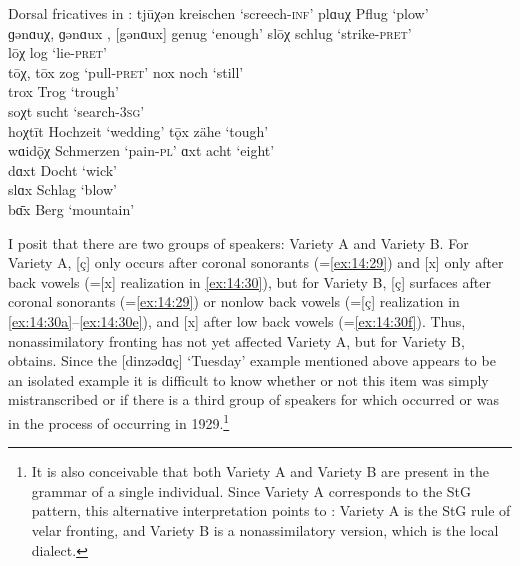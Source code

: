 \ea%
\label{ex:14:30}Dorsal fricatives in :
\ea\label{ex:14:30a} tjūχən \tab [tjuːçən] \tab  kreischen \tab ‘screech\textsc{{}-inf}’ 
\ex\label{ex:14:30b} plɑuχ \tab [plɑuç] \tab Pflug \tab ‘plow’ \\
    ɡənɑuχ, ɡənɑux \tab [gənɑuç], [gənɑux] \tab genug \tab ‘enough’   
\ex\label{ex:14:30c} slōχ \tab [sloːç] \tab schlug \tab ‘strike\textsc{{}-pret}’ \\
    lōχ \tab [loːç] \tab log \tab ‘lie\textsc{{}-pret}’ \\
    tōχ, tōx \tab  [toːç] [toːx] \tab  zog \tab ‘pull\textsc{{}-pret}’ 
\ex\label{ex:14:30d} nox \tab [nox] \tab  noch \tab ‘still’ \\
    trox \tab [trox] \tab Trog \tab ‘trough’ \\
    soχt \tab [soçt] \tab sucht \tab ‘search\textsc{{}-3sg}’ \\
    hoχtīt \tab [hoçtiːt] \tab Hochzeit \tab ‘wedding’ 
\ex\label{ex:14:30e} tǭx \tab [tɔːx] \tab zähe \tab ‘tough’ \\
    wɑidǭχ \tab [vɑidɔːç] \tab Schmerzen \tab ‘pain-\textsc{pl}’ 
\ex\label{ex:14:30f} ɑxt \tab [ɑxt] \tab acht \tab ‘eight’ \\
    dɑxt \tab [dɑxt] \tab Docht \tab ‘wick’ \\
    slɑx \tab [slɑx] \tab Schlag \tab ‘blow’ \\
    b\={ɑ}x \tab [bɑːx] \tab Berg \tab ‘mountain’ 
\z
\z 

I posit that there are two groups of speakers: Variety A and Variety B. For Variety A, [ç] only occurs after coronal sonorants (=\ref{ex:14:29}) and [x] only after back vowels (=[x] realization in \ref{ex:14:30}), but for Variety B, [ç] surfaces after coronal sonorants (=\ref{ex:14:29}) or nonlow back vowels (=[ç] realization in \ref{ex:14:30a}--\ref{ex:14:30e}), and [x] after low back vowels (=\ref{ex:14:30f}). Thus, nonassimilatory fronting has not yet affected Variety A, but for Variety B,  obtains. Since the [dinzədɑç] ‘Tuesday’ example mentioned above appears to be an isolated example it is difficult to know whether or not this item was simply mistranscribed or if there is a third group of speakers for which  occurred or was in the process of occurring in 1929.\footnote{{It is also conceivable that both Variety A and Variety B are present in the grammar of a single individual. Since Variety A corresponds to the StG pattern, this alternative interpretation points to : Variety A is the StG rule of velar fronting, and Variety B is a nonassimilatory version, which is the local dialect.}}


